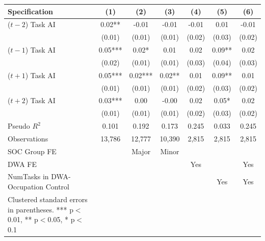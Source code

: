 \begin{tabular}{lcccccc}
\toprule
Specification & (1) & (2) & (3) & (4) & (5) & (6) \\
\midrule
($t-2$) Task AI & 0.02** & -0.01 & -0.01 & -0.01 & 0.01 & -0.01 \\
 & (0.01) & (0.01) & (0.01) & (0.02) & (0.03) & (0.02) \\
\addlinespace
($t-1$) Task AI & 0.05*** & 0.02* & 0.01 & 0.02 & 0.09** & 0.02 \\
 & (0.02) & (0.01) & (0.01) & (0.03) & (0.04) & (0.03) \\
\addlinespace
($t+1$) Task AI & 0.05*** & 0.02*** & 0.02** & 0.01 & 0.09** & 0.01 \\
 & (0.01) & (0.01) & (0.01) & (0.02) & (0.03) & (0.02) \\
\addlinespace
($t+2$) Task AI & 0.03*** & 0.00 & -0.00 & 0.02 & 0.05* & 0.02 \\
 & (0.01) & (0.01) & (0.01) & (0.02) & (0.03) & (0.02) \\
\addlinespace
\midrule
Pseudo $R^2$ & 0.101 & 0.192 & 0.173 & 0.245 & 0.033 & 0.245 \\
Observations & 13,786 & 12,777 & 10,390 & 2,815 & 2,815 & 2,815 \\
SOC Group FE &  & Major & Minor &  &  &  \\
DWA FE &  &  &  & Yes &  & Yes \\
NumTasks in DWA-Occupation Control &  &  &  &  & Yes & Yes \\
\bottomrule
\footnotesize{Clustered standard errors in parentheses. *** p$<$0.01, ** p$<$0.05, * p$<$0.1}
\end{tabular}
